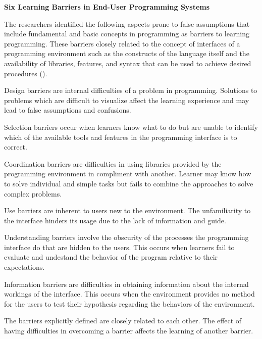 \flushleft
\textbf{Six Learning Barriers in End-User Programming Systems}\\
\justifying

\parx
The researchers identified the following aspects prone to false assumptions that include
fundamental and basic concepts in programming as barriers to learning programming.
These barriers closely related to the concept of interfaces of a programming environment
such as the constructs of the language itself and the availability of libraries,
features, and syntax that can be used to achieve desired procedures
(\cite{ko_myers_aung_2004}).

\parx
Design barriers are internal difficulties of a problem in programming. Solutions
to problems which are difficult to visualize affect the learning experience and may
lead to false assumptions and confusions.

\parx
Selection barriers occur when learners know what to do but are unable to identify which
of the available tools and features in the programming interface is to correct.

\parx
Coordination barriers are difficulties in using libraries provided by the programming
environment in compliment with another. Learner may know how to solve individual and
simple tasks but fails to combine the approaches to solve complex problems.

\parx
Use barriers are inherent to users new to the environment. The unfamiliarity to the
interface hinders its usage due to the lack of information and guide.

\parx
Understanding barriers involve the obscurity of the processes the programming interface
do that are hidden to the users. This occurs when learners fail to evaluate and
undestand the behavior of the program relative to their expectations.

\parx
Information barriers are difficulties in obtaining information about the internal
workings of the interface. This occurs when the environment provides no method for the
users to test their hypothesis regarding the behaviors of the environment.

\parx
The barriers explicitly defined are closely related to each other. The effect of having
difficulties in overcoming a barrier affects the learning of another barrier.
